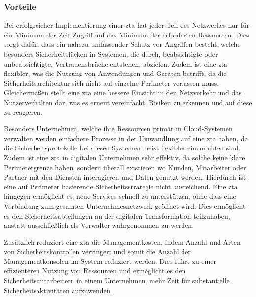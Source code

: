 \subsubsection{Vorteile}\label{subsubsec:vorteile}
Bei erfolgreicher Implementierung einer \ac{zta} hat jeder Teil des Netzwerkes nur für ein Minimum der Zeit Zugriff auf das Minimum der erforderten Ressourcen.
Dies sorgt dafür, dass ein nahezu umfassender Schutz vor Angriffen besteht, welche besonders Sicherheitslücken in Systemen, die durch, beabsichtigte oder unbeabsichtigte, Vertrauensbrüche entstehen, abzielen\autocite[\vglf][]{Edo-2022}.
Zudem ist eine \ac{zta} flexibler, was die Nutzung von Anwendungen und Geräten betrifft, da die Sicherheitsarchitektur sich nicht auf einzelne Perimeter verlassen muss.\autocites[\vglf][]{shore-2021}[\vglf][]{hunter-2020}
Gleichermaßen stellt eine \ac{zta} eine bessere Einsicht in den Netzverkehr und das Nutzerverhalten dar, was es erneut vereinfacht, Risiken zu erkennen und auf diese zu reagieren.\autocite[\vglf][]{shore-2021}

Besonders Unternehmen, welche ihre Ressourcen primär in Cloud-Systemen verwalten werden einfachere Prozesse in der Umwandlung auf eine \ac{zta} haben, da die Sicherheitsprotokolle bei diesen Systemen meist flexibler einzurichten sind.
Zudem ist eine \ac{zta} in digitalen Unternehmen sehr effektiv, da solche keine klare Perimetergrenze haben, sondern überall existieren wo Kunden, Mitarbeiter oder Partner mit den Diensten interagieren und Daten genutzt werden.
Hierdurch ist eine auf Perimeter basierende Sicherheitsstrategie nicht ausreichend.
Eine \ac{zta} hingegen ermöglicht es, neue Services schnell zu unterstützen, ohne dass eine Verbindung zum gesamten Unternehmesnetzwerk geöffnet wird.
Dies ermöglicht es den Sicherheitsabteilungen an der digitalen Transformation teilzuhaben, anstatt ausschließlich als Verwalter wahrgenommen zu werden.\autocite[\vglf][]{cunningham-2019}

Zusätzlich reduziert eine \ac{zta} die Managementkosten, indem Anzahl und Arten von Sicherheitskontrollen verringert und somit die Anzahl der Managementkonsolen im System reduziert werden.
Dies führt zu einer effizienteren Nutzung von Ressourcen und ermöglicht es den Sicherheitsmitarbeitern in einem Unternehmen, mehr Zeit für substantielle Sicherheitsaktivitäten aufzuwenden.\autocite[\vglf][]{cunningham-2019}

